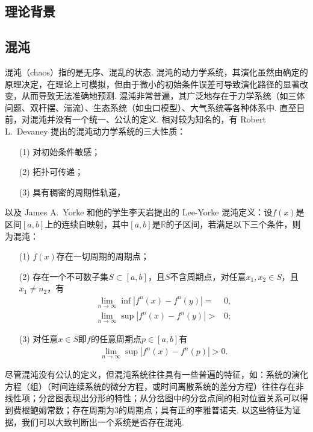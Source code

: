 \documentclass[a4paper, 10pt]{article}
\providecommand{\abs}[1]{\left\lvert#1\right\rvert} %
\begin{document}
\begin{multicols*}{2}

\section{理论背景}
\subsection{混沌}
混沌（chaos）指的是无序、混乱的状态. 混沌的动力学系统，其演化虽然由确定的原理决定，在理论上可模拟，但由于微小的初始条件误差可导致演化路径的显著改变，从而导致无法准确地预测. 混沌非常普遍，其广泛地存在于力学系统（如三体问题、双杆摆、湍流）、生态系统（如虫口模型）、大气系统等各种体系中. 直至目前，对混沌并没有一个统一、公认的定义. 相对较为知名的，有 Robert L.~Devaney 提出的混沌动力学系统的三大性质\cite{hasselblatt2003first}：
\begin{itemize}
    \item[(1)] 对初始条件敏感；
    \item[(2)] 拓扑可传递；
    \item[(3)] 具有稠密的周期性轨道，
\end{itemize}
以及 James A.~Yorke 和他的学生李天岩提出的 Lee-Yorke 混沌定义\cite{tien1975period}：设$f(x)$是区间$[a,b]$上的连续自映射，其中$[a,b]$是$\mathbb{R}$的子区间，若满足以下三个条件，则为混沌：
\begin{itemize}
    \item[(1)] $f(x)$存在一切周期的周期点；
    \item[(2)] 存在一个不可数子集$S\subset[a,b]$，且$S$不含周期点，对任意$x_1,x_2\in S$，且$x_1\neq n_2$，有
    \begin{align}
        \lim_{n\rightarrow\infty}\inf\abs{f^n(x)-f^n(y)}=&0,\\
        \lim_{n\rightarrow\infty}\sup\abs{f^n(x)-f^n(y)}>&0;
    \end{align}
    \item[(3)] 对任意$x\in S$即$f$的任意周期点$p\in[a,b]$有
    \begin{align}
        \lim_{n\rightarrow\infty}\sup\abs{f^n(x)-f^n(p)}>0.
    \end{align}
\end{itemize}
尽管混沌没有公认的定义，但混沌系统往往具有一些普遍的特征，如：系统的演化方程（组）（时间连续系统的微分方程，或时间离散系统的差分方程）往往存在非线性项；分岔图表现出分形的特性；从分岔图中的分岔点间的相对位置关系可以得到费根鲍姆常数；存在周期为$3$的周期点；具有正的李雅普诺夫. 以这些特征为证据，我们可以大致判断出一个系统是否存在混沌.


\end{multicols*}
\end{document}
